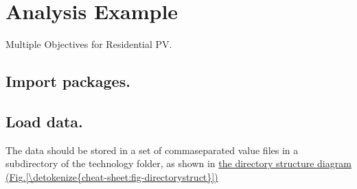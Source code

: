 \documentclass[letterpaper,10pt,english]{sphinxmanual}
\begin{document}
\begin{sphinxVerbatim}[commandchars=\\\{\}]
   \PYG{p}{[}  \PYG{p}{]}
\end{sphinxVerbatim}

\sphinxstepscope


\chapter{Analysis Example}
\label{\detokenize{example-analysis:analysis-example}}\label{\detokenize{example-analysis:sec-analysisexample}}\label{\detokenize{example-analysis::doc}}
\sphinxAtStartPar
Multiple Objectives for Residential PV.


\section{Import packages.}
\label{\detokenize{example-analysis:import-packages}}
\begin{sphinxVerbatim}[commandchars=\\\{\}]
 
 
 
\end{sphinxVerbatim}

\begin{sphinxVerbatim}[commandchars=\\\{\}]
               
   
              
             
               

              
   
\end{sphinxVerbatim}


\section{Load data.}
\label{\detokenize{example-analysis:load-data}}
\sphinxAtStartPar
The data should be stored in a set of comma\sphinxhyphen{}separated value files in a sub\sphinxhyphen{}directory of the technology folder, as shown in \hyperref[\detokenize{cheat-sheet:fig-directorystruct}]{the directory structure diagram (Fig.\@ \ref{\detokenize{cheat-sheet:fig-directorystruct}})}
\end{document}
